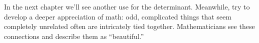 In the next chapter we'll see another use for the determinant. Meanwhile, try to develop a deeper appreciation of math: odd, complicated things that seem completely unrelated often are intricately tied together. Mathematicians see these connections and describe them as ``beautiful.''\\



